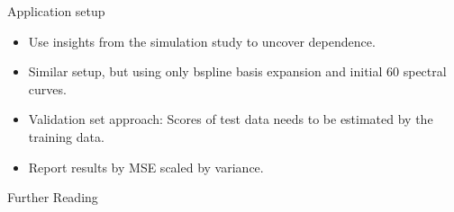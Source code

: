 \documentclass{beamer}
\begin{document}
		
		
	\begin{frame}{Application setup}
		\begin{itemize}
		\item
    		Use insights from the simulation study to uncover dependence.
    		\item
    		Similar setup, but using only bspline basis expansion and initial 60 spectral curves.
    		\item
    		Validation set approach:	Scores of test data needs to be estimated by the training data. 
    		\item
    		Report results by MSE scaled by variance.
		\end{itemize}
	\end{frame}
	
    		
	
	\begin{frame}{Further Reading}
		\nocite{hsing_theoretical_2015}
		\nocite{kokoszka_introduction_2017}
		\nocite{Bohacs_Ovadi_Salgo1998}
		\nocite{FR_li_et_al_2020} 
		\nocite{Reiss_2007b}
		\nocite{ramsay_functional_2005}
		\AtNextBibliography{\tiny}
		\printbibliography[heading=none]
	\end{frame}
	
\end{document}
